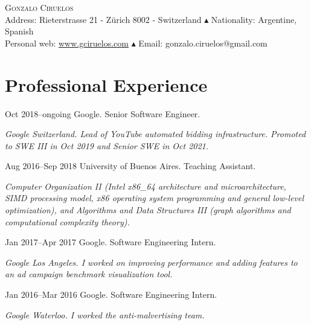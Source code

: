 \documentclass[a4paper,english,10pt]{article}
\begin{document}
\pagestyle{empty}

\begin{center}

  \Large{\textsc{Gonzalo Ciruelos}}\\
  \vspace{0.3em}
\footnotesize{
  Address: Rieterstrasse 21 - Z\"urich 8002 - Switzerland $\blacktriangle$ Nationality: Argentine, Spanish \\
  Personal web: \href{http://www.gciruelos.com}{www.gciruelos.com} $\blacktriangle$ Email: gonzalo.ciruelos@gmail.com
}
\end{center}


\section{Professional Experience}
\begin{CV}
\item[Oct 2018--ongoing] Google. Senior Software Engineer.\newline
  \begin{footnotesize}
  \emph{Google Switzerland. Lead of YouTube automated bidding infrastructure. Promoted to SWE III in Oct 2019 and Senior SWE in Oct 2021.}
  \end{footnotesize}
\item[Aug 2016--Sep 2018] University of Buenos Aires. Teaching Assistant.\newline
  \begin{footnotesize}
  \emph{Computer Organization II (Intel x86\_64 architecture and microarchitecture, SIMD processing model, x86 operating system programming and general low-level optimization), and Algorithms and Data Structures III (graph algorithms and computational complexity theory).}
  \end{footnotesize}
\item[Jan 2017--Apr 2017] Google. Software Engineering Intern.\newline
  \begin{footnotesize}
  \emph{Google Los Angeles. I worked on improving performance and adding features to an ad campaign benchmark visualization tool.}
  \end{footnotesize}
\item[Jan 2016--Mar 2016] Google. Software Engineering Intern.\newline
  \begin{footnotesize}
  \emph{Google Waterloo. I worked the anti-malvertising team.}
  \end{footnotesize}
\end{CV}
\end{document}
